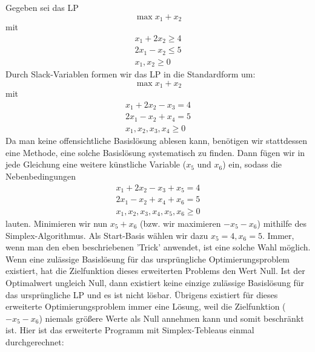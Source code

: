 \documentclass{article}
\begin{document}
Gegeben sei das LP \[
\max x_1+x_2
\]mit\[\begin{matrix}
x_1+2x_2\geq4\\2x_1-x_2\leq5\\x_1,x_2\geq0
\end{matrix}\]
Durch Slack-Variablen formen wir das LP in die Standardform um:
\[\max x_1+x_2\]
mit\[\begin{matrix}
x_1+2x_2-x_3=4\\2x_1-x_2+x_4=5\\x_1,x_2,x_3,x_4\geq0
\end{matrix}
\]Da man keine offensichtliche Basislösung ablesen kann, benötigen wir stattdessen eine Methode, eine solche Basislösung systematisch zu finden. Dann fügen wir in jede Gleichung eine weitere künstliche Variable (\(x_5\) und \(x_6\)) ein, sodass die Nebenbedingungen\[
\begin{matrix}
x_1+2x_2-x_3+x_5=4\\2x_1-x_2+x_4+x_6=5\\x_1,x_2,x_3,x_4,x_5,x_6\geq0
\end{matrix}
\]lauten. Minimieren wir nun \(x_5+x_6\) (bzw. wir maximieren \(-x_5-x_6\)) mithilfe des Simplex-Algorithmus. Als Start-Basis wählen wir dazu \(x_5=4,x_6=5\). Immer, wenn man den eben beschriebenen 'Trick' anwendet, ist eine solche Wahl möglich. Wenn eine zulässige Basislösung für das ursprüngliche Optimierungsproblem existiert, hat die Zielfunktion dieses erweiterten Problems den Wert Null. Ist der Optimalwert ungleich Null, dann existiert keine einzige zulässige Basislösung für das ursprüngliche LP und es ist nicht lösbar. Übrigens existiert für dieses erweiterte Optimierungsproblem immer eine Lösung, weil die Zielfunktion (\(-x_5-x_6\)) niemals größere Werte als Null annehmen kann und somit beschränkt ist. Hier ist das erweiterte Programm mit Simplex-Tebleaus einmal durchgerechnet:
\end{document}
